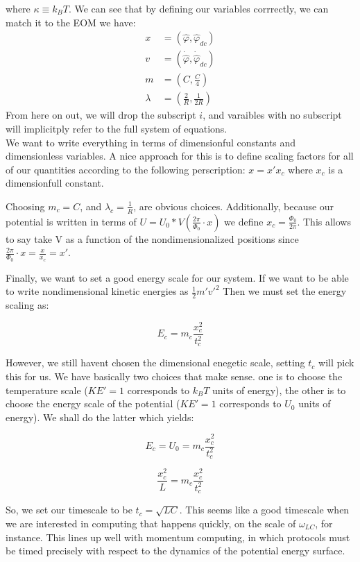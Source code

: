\documentclass[paper=a4, twocolumn, fontsize=10pt]{article} %
\numberwithin{equation}{section} %
\numberwithin{figure}{section} %
\numberwithin{table}{section} %
\def \df#1{\hat{#1}}
\begin{document}
where $\kappa\equiv k_B T$. We can see that by defining our variables corrrectly, we can match it to the EOM we have:
\begin{align*}
x &=  (\df\varphi, \df\varphi_{dc}) \\
v &= (\dot{\df\varphi}, \dot{\df\varphi}_{dc}) \\
m &= ( C, \frac{C}{4}) \\
\lambda &= (\frac{2}{R}, \frac{1}{2R})
\end{align*}
From here on out, we will drop the subscript $i$, and varaibles with no subscript will implicitply refer to the full system of equations.\\

We want to write everything in terms of dimensionful constants and dimensionless variables. A nice approach for this is to define scaling factors for all of our quantities according to the following perscription: $ x = x' x_c$ where $x_c$ is a dimensionfull constant.

Choosing $m_c = C $, and $\lambda_c = \frac{1}{R}$, are obvious choices. Additionally, because our potential is written in terms of $U = U_0 * V(\frac{2\pi}{\Phi_0} \cdot x) $ we define $x_c = \frac{\Phi_0}{2\pi}$. This allows to say take V as a function of the nondimensionalized positions since $\frac{2\pi}{\Phi_0} \cdot x = \frac{x}{x_c} = x' $.


Finally, we want to set a good energy scale for our system. If we want to be able to write nondimensional kinetic energies as $\frac{1}{2} m' v'^2$ Then we must set the energy scaling as:

\[ E_c  = m_c \frac{ x^2_c}{t^2_c} \]

However, we still havent chosen the dimensional enegetic scale, setting $t_c$ will pick this for us. We have basically two choices that make sense. one is to choose the temperature scale ($KE'=1$ corresponds to $k_B T$ units of energy), the other is to choose the energy scale of the potential ($KE'=1$ corresponds to $U_0$ units of energy). We shall do the latter which yields:

\[ E_c = U_0 = m_c \frac{ x^2_c}{t^2_c} \]

\[ \frac{x_c^2}{L} = m_c \frac{ x^2_c}{t^2_c} \]

So, we set our timescale to be $t_c = \sqrt{LC} $. This seems like a good timescale when we are interested in computing that happens quickly, on the scale of $\omega_{LC}$, for instance. This lines up well with momentum computing, in which protocols must be timed precisely with respect to the dynamics of the potential energy surface.
\end{document}
